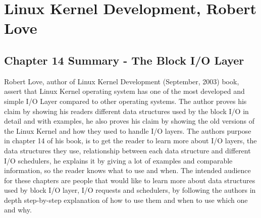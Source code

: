 \documentclass[letterpaper,10pt,draftclsnofoot,onecolumn]{IEEEtran}
\begin{document}


	
\section*{Linux Kernel Development, Robert Love}
\subsection*{Chapter 14 Summary - The Block I/O Layer}

Robert Love, author of Linux Kernel Development (September, 2003) book, assert that Linux Kernel operating system has one of the most developed and simple I/O Layer compared to other operating systems. The author proves his claim by showing his readers different data structures used by the block I/O in detail and with examples, he also proves his claim by showing the old versions of the Linux Kernel and how they used to handle I/O layers. The author\textquotesingle s purpose in chapter 14 of his book, is to get the reader to learn more about I/O layers, the data structures they use, relationship between each data structure and different I/O schedulers, he explains it by giving a lot of examples and comparable information, so the reader knows what to use and when. The intended audience for these chapters are people that would like to learn more about data structures used by block I/O layer, I/O requests and schedulers, by following the author\textquotesingle s in depth step-by-step explanation of how to use them and when to use which one and why.
\end{document}
